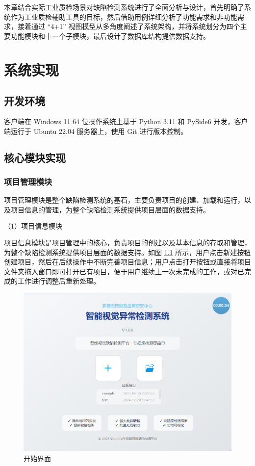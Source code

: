 \documentclass[
  ]{njuthesis}
\begin{document}
本章结合实际工业质检场景对缺陷检测系统进行了全面分析与设计，首先明确了系统作为工业质检辅助工具的目标，然后借助用例详细分析了功能需求和非功能需求，接着通过 “4+1” 视图模型从多角度阐述了系统架构，并将系统划分为四个主要功能模块和十一个子模块，最后设计了数据库结构提供数据支持。

\chapter{系统实现}

\section{开发环境}

客户端在 Windows 11 64 位操作系统上基于 Python 3.11 和 PySide6 开发，客户端运行于 Ubuntu 22.04 服务器上，使用 Git 进行版本控制。

\section{核心模块实现}

\subsection{项目管理模块}

项目管理模块是整个缺陷检测系统的基石，主要负责项目的创建、加载和运行，以及项目信息的管理，为整个缺陷检测系统提供项目层面的数据支持。

（1）项目信息模块

项目信息模块是项目管理中的核心，负责项目的创建以及基本信息的存取和管理，为整个缺陷检测系统提供项目层面的数据支持。如图 \ref{开始界面} 所示，用户点击新建按钮创建项目，然后在后续操作中不断完善项目信息；用户点击打开按钮或直接将项目文件夹拖入窗口即可打开已有项目，便于用户继续上一次未完成的工作，或对已完成的工作进行调整后重新处理。

\begin{figure}[htb]
    \centering
    \includegraphics[width=\textwidth]{images/开始界面.png}
    \caption{开始界面}
    \label{开始界面}
\end{figure}
\end{document}
